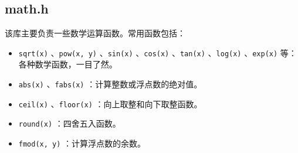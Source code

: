 \subsection{math.h}

该库主要负责一些数学运算函数。常用函数包括：
\begin{itemize}
  \item \texttt{sqrt(x)} 、\texttt{pow(x, y)} 、\texttt{sin(x)} 、\texttt{cos(x)} 、\texttt{tan(x)} 、\texttt{log(x)} 、\texttt{exp(x)} 等：各种数学函数，一目了然。
  \item \texttt{abs(x)} 、\texttt{fabs(x)} ：计算整数或浮点数的绝对值。
  \item \texttt{ceil(x)} 、\texttt{floor(x)} ：向上取整和向下取整函数。
  \item \texttt{round(x)} ：四舍五入函数。
  \item \texttt{fmod(x, y)} ：计算浮点数的余数。
\end{itemize}


